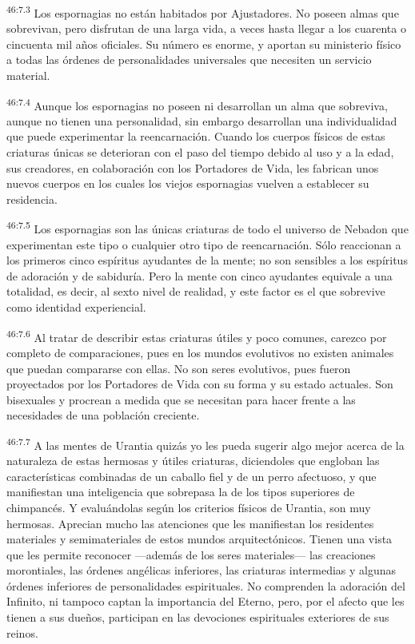 \par
\textsuperscript{46:7.3} Los espornagias no están habitados por Ajustadores. No poseen almas que sobrevivan, pero disfrutan de una larga vida, a veces hasta llegar a los cuarenta o cincuenta mil años oficiales. Su número es enorme, y aportan su ministerio físico a todas las órdenes de personalidades universales que necesiten un servicio material.

\par
\textsuperscript{46:7.4} Aunque los espornagias no poseen ni desarrollan un alma que sobreviva, aunque no tienen una personalidad, sin embargo desarrollan una individualidad que puede experimentar la reencarnación. Cuando los cuerpos físicos de estas criaturas únicas se deterioran con el paso del tiempo debido al uso y a la edad, sus creadores, en colaboración con los Portadores de Vida, les fabrican unos nuevos cuerpos en los cuales los viejos espornagias vuelven a establecer su residencia.

\par
\textsuperscript{46:7.5} Los espornagias son las únicas criaturas de todo el universo de Nebadon que experimentan este tipo o cualquier otro tipo de reencarnación. Sólo reaccionan a los primeros cinco espíritus ayudantes de la mente; no son sensibles a los espíritus de adoración y de sabiduría. Pero la mente con cinco ayudantes equivale a una totalidad, es decir, al sexto nivel de realidad, y este factor es el que sobrevive como identidad experiencial.

\par
\textsuperscript{46:7.6} Al tratar de describir estas criaturas útiles y poco comunes, carezco por completo de comparaciones, pues en los mundos evolutivos no existen animales que puedan compararse con ellas. No son seres evolutivos, pues fueron proyectados por los Portadores de Vida con su forma y su estado actuales. Son bisexuales y procrean a medida que se necesitan para hacer frente a las necesidades de una población creciente.

\par
\textsuperscript{46:7.7} A las mentes de Urantia quizás yo les pueda sugerir algo mejor acerca de la naturaleza de estas hermosas y útiles criaturas, diciendoles que engloban las características combinadas de un caballo fiel y de un perro afectuoso, y que manifiestan una inteligencia que sobrepasa la de los tipos superiores de chimpancés. Y evaluándolas según los criterios físicos de Urantia, son muy hermosas. Aprecian mucho las atenciones que les manifiestan los residentes materiales y semimateriales de estos mundos arquitectónicos. Tienen una vista que les permite reconocer ---además de los seres materiales--- las creaciones morontiales, las órdenes angélicas inferiores, las criaturas intermedias y algunas órdenes inferiores de personalidades espirituales. No comprenden la adoración del Infinito, ni tampoco captan la importancia del Eterno, pero, por el afecto que les tienen a sus dueños, participan en las devociones espirituales exteriores de sus reinos.

